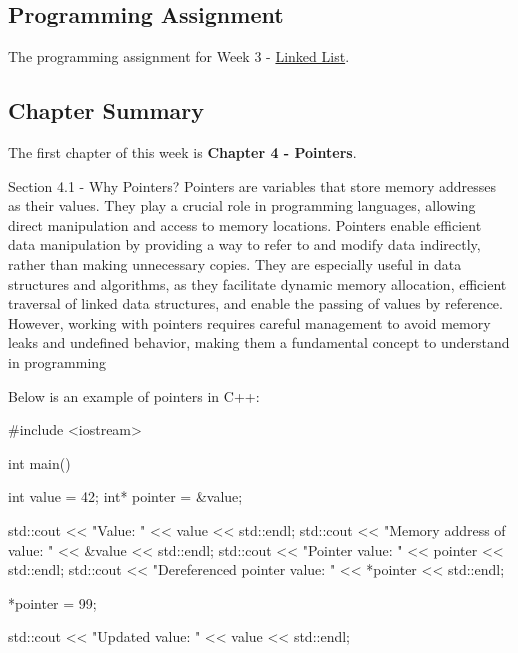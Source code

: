 \subsection{Programming Assignment}

The programming assignment for Week 3 - \href{https://github.com/QuantumCompiler/CU/tree/main/CSPB%202270%20-%20Data%20Structures/CSPB%202270%20-%20Programming%20Assignments/CSPB%202270%20-%20Assignment%202%20-%20Linked%20List}{Linked List}.

\subsection{Chapter Summary}

The first chapter of this week is \textbf{Chapter 4 - Pointers}.

\begin{notes}{Section 4.1 - Why Pointers?}
    Pointers are variables that store memory addresses as their values. They play a crucial role in programming languages, allowing direct manipulation and access to memory locations. Pointers enable efficient data manipulation 
    by providing a way to refer to and modify data indirectly, rather than making unnecessary copies. They are especially useful in data structures and algorithms, as they facilitate dynamic memory allocation, efficient traversal 
    of linked data structures, and enable the passing of values by reference. However, working with pointers requires careful management to avoid memory leaks and undefined behavior, making them a fundamental concept to understand 
    in programming
    
    \begin{highlight}
        Below is an example of pointers in C++:
    \begin{code}[C++]
    #include <iostream>

    int main() {
        int value = 42;
        int* pointer = &value;
    
        std::cout << "Value: " << value << std::endl;
        std::cout << "Memory address of value: " << &value << std::endl;
        std::cout << "Pointer value: " << pointer << std::endl;
        std::cout << "Dereferenced pointer value: " << *pointer << std::endl;
    
        *pointer = 99;
    
        std::cout << "Updated value: " << value << std::endl;
    
}
\end{code}
\end{highlight}
\end{notes}
